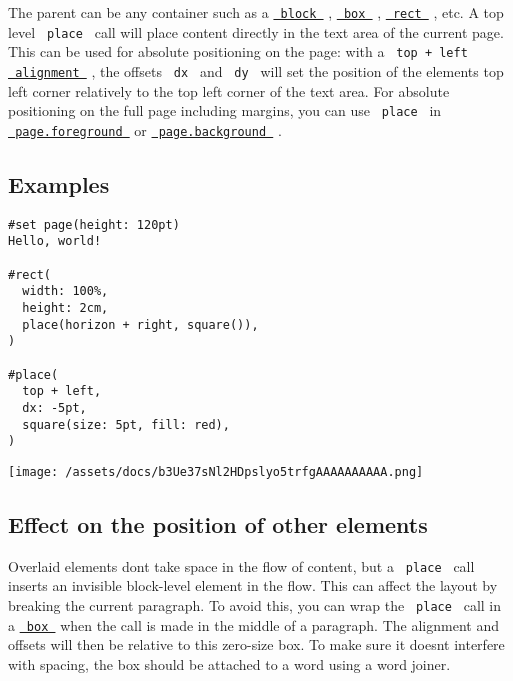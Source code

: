 The parent can be any container such as a
\href{/docs/reference/layout/block/}{\texttt{\ block\ }} ,
\href{/docs/reference/layout/box/}{\texttt{\ box\ }} ,
\href{/docs/reference/visualize/rect/}{\texttt{\ rect\ }} , etc. A top
level \texttt{\ place\ } call will place content directly in the text
area of the current page. This can be used for absolute positioning on
the page: with a \texttt{\ top\ +\ left\ }
\href{/docs/reference/layout/place/\#parameters-alignment}{\texttt{\ alignment\ }}
, the offsets \texttt{\ dx\ } and \texttt{\ dy\ } will set the position
of the element\textquotesingle s top left corner relatively to the top
left corner of the text area. For absolute positioning on the full page
including margins, you can use \texttt{\ place\ } in
\href{/docs/reference/layout/page/\#parameters-foreground}{\texttt{\ page.foreground\ }}
or
\href{/docs/reference/layout/page/\#parameters-background}{\texttt{\ page.background\ }}
.

\subsection{Examples}\label{examples}

\begin{verbatim}
#set page(height: 120pt)
Hello, world!

#rect(
  width: 100%,
  height: 2cm,
  place(horizon + right, square()),
)

#place(
  top + left,
  dx: -5pt,
  square(size: 5pt, fill: red),
)
\end{verbatim}

\texttt{[image: /assets/docs/b3Ue37sNl2HDpslyo5trfgAAAAAAAAAA.png]}

\subsection{Effect on the position of other
elements}\label{effect-on-other-elements}

Overlaid elements don\textquotesingle t take space in the flow of
content, but a \texttt{\ place\ } call inserts an invisible block-level
element in the flow. This can affect the layout by breaking the current
paragraph. To avoid this, you can wrap the \texttt{\ place\ } call in a
\href{/docs/reference/layout/box/}{\texttt{\ box\ }} when the call is
made in the middle of a paragraph. The alignment and offsets will then
be relative to this zero-size box. To make sure it
doesn\textquotesingle t interfere with spacing, the box should be
attached to a word using a word joiner.

